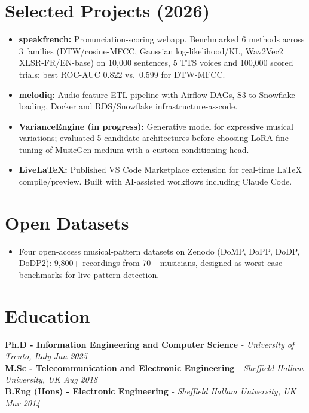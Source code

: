 \documentclass[11pt]{article}
\begin{document}
\section*{Selected Projects (2026)}
\begin{itemize}[leftmargin=1.2em, itemsep=-0.25em]
    \item \textbf{speakfrench:} Pronunciation-scoring webapp. Benchmarked 6 methods across 3 families (DTW/cosine-MFCC, Gaussian log-likelihood/KL, Wav2Vec2 XLSR-FR/EN-base) on 10,000 sentences, 5 TTS voices and 100,000 scored trials; best ROC-AUC 0.822 vs.\ 0.599 for DTW-MFCC.
    \item \textbf{melodiq:} Audio-feature ETL pipeline with Airflow DAGs, S3-to-Snowflake loading, Docker and RDS/Snowflake infrastructure-as-code.
    \item \textbf{VarianceEngine (in progress):} Generative model for expressive musical variations; evaluated 5 candidate architectures before choosing LoRA fine-tuning of MusicGen-medium with a custom conditioning head.
    \item \textbf{LiveLaTeX:} Published VS Code Marketplace extension for real-time LaTeX compile/preview. Built with AI-assisted workflows including Claude Code.
\end{itemize}

\section*{Open Datasets}
\begin{itemize}[leftmargin=1.2em, itemsep=-0.25em]
    \item Four open-access musical-pattern datasets on Zenodo (DoMP, DoPP, DoDP, DoDP2): 9,800+ recordings from 70+ musicians, designed as worst-case benchmarks for live pattern detection.
\end{itemize}

\section*{Education}
\noindent\textbf{Ph.D - Information Engineering and Computer Science} \textit{\small{ - University of Trento, Italy}} \hfill \textit{Jan 2025}\\[2pt]
\noindent\textbf{M.Sc - Telecommunication and Electronic Engineering} \textit{\small{ - Sheffield Hallam University, UK}} \hfill \textit{Aug 2018}\\[2pt]
\noindent\textbf{B.Eng (Hons) - Electronic Engineering} \textit{\small{ - Sheffield Hallam University, UK}} \hfill \textit{Mar 2014}
\end{document}
